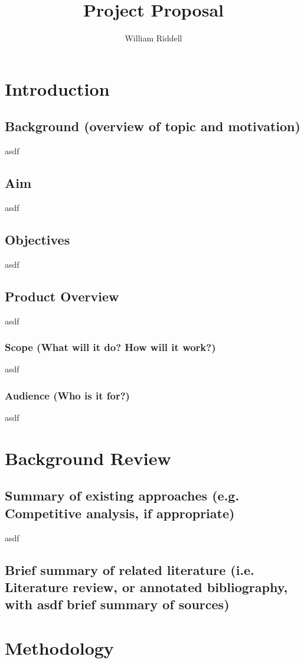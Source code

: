 \documentclass[12pt]{article}
\title{Project Proposal}
\author{William Riddell}
\begin{document}
\maketitle



\section{Introduction}
\subsection{Background (overview of topic and motivation)}
asdf
\cite{test}
\subsection{Aim}
asdf
\subsection{Objectives}
asdf
\subsection{Product Overview}
asdf
\subsubsection{Scope (What will it do? How will it work?)}
asdf
\subsubsection{Audience (Who is it for?)}
asdf

\section{Background Review}
\subsection{Summary of existing approaches (e.g. Competitive analysis, if appropriate)}
asdf
\subsection{Brief summary of related literature (i.e. Literature review, or annotated bibliography, with
asdf
brief summary of sources)}

\section{Methodology}
\end{document}
